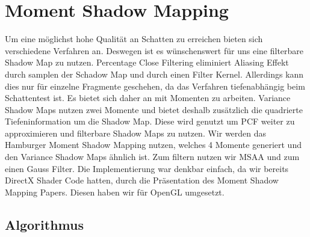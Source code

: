 \documentclass[runningheaders,a4paper]{llncs}
\begin{document}
\section{Moment Shadow Mapping}

Um eine möglichst hohe Qualität an Schatten zu erreichen bieten sich verschiedene Verfahren an. Deswegen ist es wünschenswert für uns eine filterbare Shadow Map zu nutzen. Percentage Close Filtering eliminiert Aliasing Effekt durch samplen der Schadow Map und durch einen Filter Kernel.\cite{msm} 
Allerdings kann dies nur für einzelne Fragmente geschehen, da das Verfahren tiefenabhängig beim Schattentest ist.\cite{msm}
Es bietet sich daher an mit Momenten zu arbeiten. Variance Shadow Maps nutzen zwei Momente und bietet deshalb zusätzlich die quadrierte Tiefeninformation um die Shadow Map. Diese wird genutzt um PCF weiter zu approximieren und filterbare Shadow Maps zu nutzen.\cite{donnelly2006variance}
Wir werden das Hamburger Moment Shadow Mapping nutzen, welches 4 Momente generiert und den Variance Shadow Maps ähnlich ist. Zum filtern nutzen wir MSAA und zum einen Gauss Filter. Die Implementierung war denkbar einfach, da wir bereits DirectX Shader Code hatten, durch die Präsentation des Moment Shadow Mapping Papers\cite{msm}. Diesen haben wir für OpenGL umgesetzt.

\subsection{Algorithmus}
\end{document}
